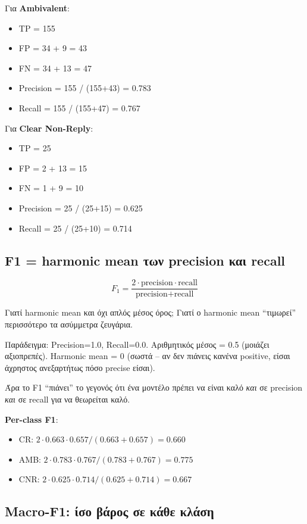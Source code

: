 \documentclass[12pt]{fphw}
\begin{document}
Για \textbf{Ambivalent}:
\begin{itemize}
    \item TP = 155
    \item FP = 34 + 9 = 43
    \item FN = 34 + 13 = 47
    \item Precision = 155 / (155+43) = 0.783
    \item Recall = 155 / (155+47) = 0.767
\end{itemize}

Για \textbf{Clear Non-Reply}:
\begin{itemize}
    \item TP = 25
    \item FP = 2 + 13 = 15
    \item FN = 1 + 9 = 10
    \item Precision = 25 / (25+15) = 0.625
    \item Recall = 25 / (25+10) = 0.714
\end{itemize}

\subsection{F1 = harmonic mean των precision και recall}

\[
F_1 = \frac{2 \cdot \text{precision} \cdot \text{recall}}{\text{precision} + \text{recall}}
\]

Γιατί harmonic mean και όχι απλός μέσος όρος; Γιατί ο harmonic mean ``τιμωρεί'' περισσότερο τα ασύμμετρα ζευγάρια.

Παράδειγμα: Precision=1.0, Recall=0.0. Αριθμητικός μέσος = 0.5 (μοιάζει αξιοπρεπές). Harmonic mean = 0 (σωστά -- αν δεν πιάνεις κανένα positive, είσαι άχρηστος ανεξαρτήτως πόσο precise είσαι).

Άρα το F1 ``πιάνει'' το γεγονός ότι ένα μοντέλο πρέπει να είναι καλό \emph{και} σε precision \emph{και} σε recall για να θεωρείται καλό.

\textbf{Per-class F1}:
\begin{itemize}
    \item CR: $2 \cdot 0.663 \cdot 0.657 / (0.663 + 0.657) = 0.660$
    \item AMB: $2 \cdot 0.783 \cdot 0.767 / (0.783 + 0.767) = 0.775$
    \item CNR: $2 \cdot 0.625 \cdot 0.714 / (0.625 + 0.714) = 0.667$
\end{itemize}

\subsection{Macro-F1: ίσο βάρος σε κάθε κλάση}
\end{document}
